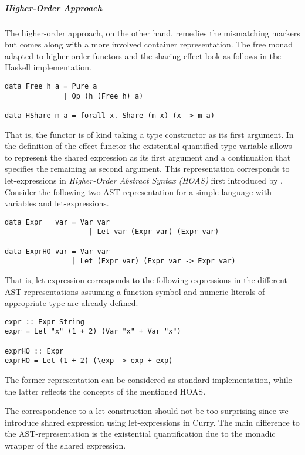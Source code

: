 \subparagraph{Higher-Order Approach}
The higher-order approach, on the other hand, remedies the mismatching
markers but comes along with a more involved container representation.
The free monad adapted to higher-order functors and the sharing effect
look as follows in the Haskell implementation.

\begin{verbatim}
data Free h a = Pure a
              | Op (h (Free h) a)  

data HShare m a = forall x. Share (m x) (x -> m a)
\end{verbatim}

That is, the functor  is of kind \hinl{(* -> *) -> * -> *}
taking a type constructor as its first argument.
In the definition of the effect functor  the existential
quantified type variable   allows to represent the shared
expression as its first argument  and a continuation  that specifies the remaining as second argument.
This representation corresponds to let-expressions in
\emph{Higher-Order Abstract Syntax (HOAS)} first introduced by
\citet{pfenning1988higher}.
Consider the following two AST-representation for a simple language
with variables and let-expressions.

\begin{verbatim}
data Expr   var = Var var
                    | Let var (Expr var) (Expr var)

data ExprHO var = Var var
                | Let (Expr var) (Expr var -> Expr var)
\end{verbatim}

That is, let-expression 
corresponds to the following expressions in the different
AST-representations assuming a function symbol \hinl{+} and numeric
literals of appropriate type are already defined.

\begin{verbatim}
expr :: Expr String
expr = Let "x" (1 + 2) (Var "x" + Var "x")

exprHO :: Expr
exprHO = Let (1 + 2) (\exp -> exp + exp)
\end{verbatim}

The former representation can be considered as standard
implementation, while the latter reflects the concepts of the
mentioned HOAS.

The correspondence to a let-construction should not be too surprising
since we introduce shared expression using let-expressions in Curry.
The main difference to the AST-representation is the existential
quantification due to the monadic wrapper of the shared expression.

